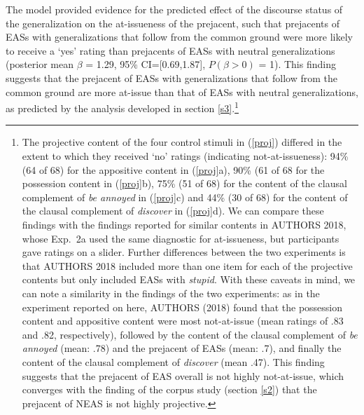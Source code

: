 \documentclass[11pt,fleqn]{article}
\newcommand{\6}{\mbox{$[\hspace*{-.6mm}[$}}
\newcommand{\9}{\mbox{$]\hspace*{-.6mm}]$}}
\begin{document}
The model provided evidence for the predicted effect of the discourse status of the generalization on the at-issueness of the prejacent, such that  prejacents of EASs with generalizations that follow from the common ground were more likely to receive a `yes' rating than prejacents of EASs with neutral generalizations  (posterior mean $\beta$ = 1.29, 95\% CI={[}0.69,1.87{]}, $P(\beta > 0)$ = 1). This finding suggests that the prejacent of EASs with generalizations that follow from the common ground are more at-issue than that of EASs with neutral generalizations, as predicted by the analysis developed in section \ref{s3}.\footnote{The projective content of the four control stimuli in (\ref{proj}) differed in the extent to which they received `no' ratings (indicating not-at-issueness): 94\% (64 of 68) for the appositive content in (\ref{proj}a), 90\% (61 of 68 for the possession content in (\ref{proj}b), 75\% (51 of 68) for the content of the clausal complement of {\em be annoyed} in (\ref{proj}c) and 44\% (30 of 68) for the content of the clausal complement of {\em discover} in (\ref{proj}d). We can compare these findings with the findings reported for similar contents in AUTHORS 2018, whose Exp.~2a used the same diagnostic for at-issueness, but participants gave ratings on a slider. Further differences between the two experiments is that AUTHORS 2018 included more than one item for each of the projective contents but only included EASs with {\em stupid}. With these caveats in mind, we can note a similarity in the findings of the two experiments: as in the experiment reported on here, AUTHORS (2018) found that the possession content and appositive content were most not-at-issue (mean ratings of .83 and .82, respectively), followed by the content of the clausal complement of {\em be annoyed} (mean: .78) and the prejacent of EASs (mean: .7), and finally the content of the clausal complement of {\em discover} (mean .47). This finding suggests that the prejacent of EAS overall is not highly not-at-issue, which converges with the finding of the corpus study (section \ref{s2}) that the prejacent of NEAS is not highly projective.}



  
\end{document}

